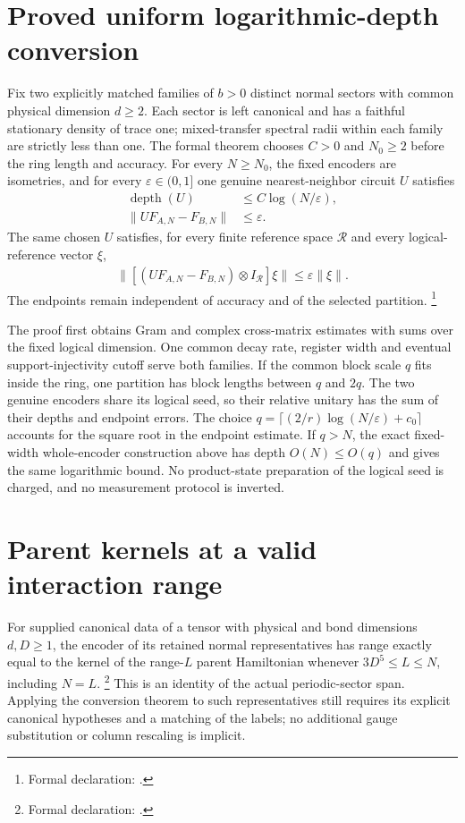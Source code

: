 \documentclass{article}
\begin{document}
\section{Proved uniform logarithmic-depth conversion}
Fix two explicitly matched families of $b>0$ distinct normal sectors with
common physical dimension $d\ge2$. Each sector is left canonical and has
a faithful stationary density of trace one; mixed-transfer spectral radii
within each family are strictly less than one. The formal theorem chooses
$C>0$ and $N_0\ge2$ before the ring length and accuracy. For every
$N\ge N_0$, the fixed encoders are isometries, and for every
$\varepsilon\in(0,1]$ one genuine nearest-neighbor circuit $U$ satisfies
\begin{align}
    \operatorname{depth}(U) & \le C\log(N/\varepsilon), \\
    \|UF_{A,N}-F_{B,N}\|    & \le\varepsilon.
\end{align}
The same chosen $U$ satisfies, for every finite reference space $\mathcal R$
and every logical-reference vector $\xi$,
\begin{align}
    \|[(UF_{A,N}-F_{B,N})\otimes I_{\mathcal R}]\xi\|
    \le\varepsilon\|\xi\|.
\end{align}
The endpoints remain independent of accuracy and of the selected partition.
\footnote{Formal declaration:
    .}

The proof first obtains Gram and complex cross-matrix estimates with sums
over the fixed logical dimension. One common decay rate, register width
and eventual support-injectivity cutoff serve both families. If the common
block scale $q$ fits inside the ring, one partition has block lengths between
$q$ and $2q$. The two genuine encoders share its logical seed, so their
relative unitary has the sum of their depths and endpoint errors.
The choice $q=\lceil(2/r)\log(N/\varepsilon)+c_0\rceil$ accounts for the
square root in the endpoint estimate. If $q>N$, the exact fixed-width
whole-encoder construction above has depth $O(N)\le O(q)$ and gives the
same logarithmic bound. No product-state preparation of the logical seed
is charged, and no measurement protocol is inverted.

\section{Parent kernels at a valid interaction range}
For supplied canonical data of a tensor with physical and bond dimensions
$d,D\ge1$, the encoder of its retained normal representatives has range
exactly equal to the kernel of the range-$L$ parent Hamiltonian whenever
$3D^5\le L\le N$, including $N=L$.
\footnote{Formal declaration:
    .}
This is an identity of the actual periodic-sector span. Applying the
conversion theorem to such representatives still requires its explicit
canonical hypotheses and a matching of the labels; no additional gauge
substitution or column rescaling is implicit.
\end{document}
